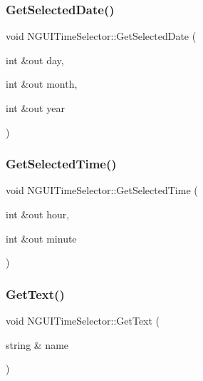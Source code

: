 \hypertarget{class_n_g_u_i_time_selector_ab7113e1c2dd3fac092831e8468c49edd}{}\label{class_n_g_u_i_time_selector_ab7113e1c2dd3fac092831e8468c49edd} 
\subsubsection{\texorpdfstring{Get\+Selected\+Date()}{GetSelectedDate()}}
{\footnotesize\ttfamily void N\+G\+U\+I\+Time\+Selector\+::\+Get\+Selected\+Date (\begin{DoxyParamCaption}\item[{int \&out}]{day,  }\item[{int \&out}]{month,  }\item[{int \&out}]{year }\end{DoxyParamCaption})}

\hypertarget{class_n_g_u_i_time_selector_a29e7dbd4217079b371e8d82bab8c91fd}{}\label{class_n_g_u_i_time_selector_a29e7dbd4217079b371e8d82bab8c91fd} 
\subsubsection{\texorpdfstring{Get\+Selected\+Time()}{GetSelectedTime()}}
{\footnotesize\ttfamily void N\+G\+U\+I\+Time\+Selector\+::\+Get\+Selected\+Time (\begin{DoxyParamCaption}\item[{int \&out}]{hour,  }\item[{int \&out}]{minute }\end{DoxyParamCaption})}

\hypertarget{class_n_g_u_i_time_selector_a94da848e963f66e3c3c49b604e817e0a}{}\label{class_n_g_u_i_time_selector_a94da848e963f66e3c3c49b604e817e0a} 
\subsubsection{\texorpdfstring{Get\+Text()}{GetText()}}
{\footnotesize\ttfamily void N\+G\+U\+I\+Time\+Selector\+::\+Get\+Text (\begin{DoxyParamCaption}\item[{string \&}]{name }\end{DoxyParamCaption})}

